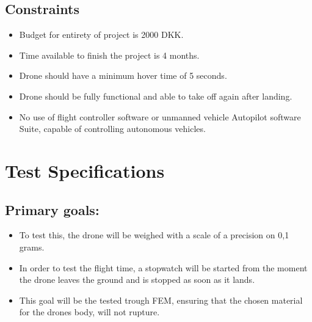 \documentclass{article}
\begin{document}
 
\subsection{Constraints}

\begin{itemize}
    \item 
    Budget for entirety of project is 2000 DKK.  
    \item
    Time available to finish the project is 4 months.
    \item
    Drone should have a minimum hover time of 5 seconds. 
    \item
    Drone should be fully functional and able to take off again after landing.
    \item
    No use of flight controller software or unmanned vehicle Autopilot software Suite, capable of controlling autonomous vehicles. 
\end{itemize}
 

\section {Test Specifications} 
\subsection{Primary goals:}
\begin{itemize}
    \item
    To test this, the drone will be weighed with a scale of a precision on 0,1 grams.
    \item  
    In order to test the flight time, a stopwatch will be started from the moment the drone leaves the ground and is stopped as soon as it lands.
    \item
    This goal will be the tested trough FEM, ensuring that the chosen material for the drones body, will not rupture.
\end{itemize}
  
\end{document}
